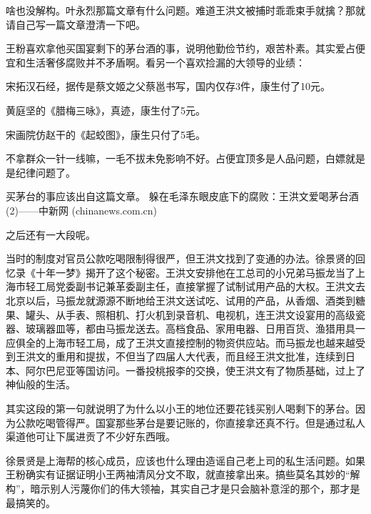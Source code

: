 \begin{zhihuanswer}
啥也没解构。叶永烈那篇文章有什么问题。难道王洪文被捕时乖乖束手就擒？那就请自己写一篇文章澄清一下吧。

王粉喜欢拿他买国宴剩下的茅台酒的事，说明他勤俭节约，艰苦朴素。其实爱占便宜和生活奢侈腐败并不矛盾啊。看另一个喜欢捡漏的大领导的业绩：

宋拓汉石经，据传是蔡文姬之父蔡邕书写，国内仅存3件，康生付了10元。

黄庭坚的《腊梅三咏》，真迹，康生付了5元。

宋画院仿赵干的《起蛟图》，康生只付了5毛。

不拿群众一针一线嘛，一毛不拔未免影响不好。占便宜顶多是人品问题，白嫖就是是纪律问题了。

买茅台的事应该出自这篇文章。
躲在毛泽东眼皮底下的腐败：王洪文爱喝茅台酒(2)------中新网
(chinanews.com.cn)

之后还有一大段呢。

当时的制度对官员公款吃喝限制得很严，但王洪文找到了变通的办法。徐景贤的回忆录《十年一梦》揭开了这个秘密。王洪文安排他在工总司的小兄弟马振龙当了上海市轻工局党委副书记兼革委副主任，直接掌握了试制试用产品的大权。王洪文去北京以后，马振龙就源源不断地给王洪文送试吃、试用的产品，从香烟、酒类到糖果、罐头、从手表、照相机、打火机到录音机、电视机，连王洪文设宴用的高级瓷器、玻璃器皿等，都由马振龙送去。高档食品、家用电器、日用百货、渔猎用具一应俱全的上海市轻工局，成了王洪文直接控制的物资供应站。而马振龙也越来越受到王洪文的重用和提拔，不但当了四届人大代表，而且经王洪文批准，连续到日本、阿尔巴尼亚等国访问。一番投桃报李的交换，使王洪文有了物质基础，过上了神仙般的生活。

其实这段的第一句就说明了为什么以小王的地位还要花钱买别人喝剩下的茅台。因为公款吃喝管得严。国宴那些茅台是要记账的，你直接拿还真不行。但是通过私人渠道他可让下属进贡了不少好东西哦。

徐景贤是上海帮的核心成员，应该也什么理由造谣自己老上司的私生活问题。如果王粉确实有证据证明小王两袖清风分文不取，就直接拿出来。搞些莫名其妙的``解构''，暗示别人污蔑你们的伟大领袖，其实自己才是只会脑补意淫的那个，那才是最搞笑的。
\end{zhihuanswer}
